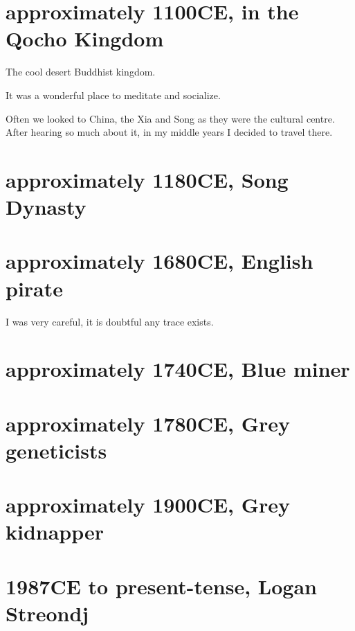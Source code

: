 \chapter{approximately 1100CE, in the Qocho Kingdom}
The cool desert Buddhist kingdom.

It was a wonderful place to meditate and socialize. 

Often we looked to China, the Xia and Song as they were the cultural centre. 
After hearing so much about it, in my middle years I decided to travel there.

\chapter{approximately 1180CE, Song Dynasty}

\chapter{approximately 1680CE, English pirate}

I was very careful, it is doubtful any trace exists. 

\chapter{approximately 1740CE, Blue miner}
\chapter{approximately 1780CE, Grey geneticists}
\chapter{approximately 1900CE, Grey kidnapper}
\chapter{1987CE to present-tense, Logan Streondj}

